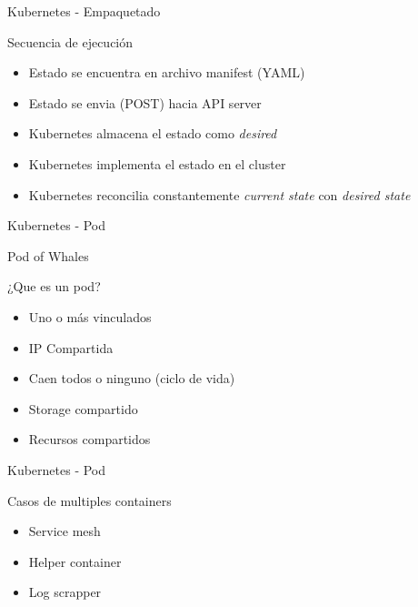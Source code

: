 \documentclass[aspectratio=169]{beamer}
\begin{document}
\begin{frame}{Kubernetes - Empaquetado}

    \begin{exampleblock}{Secuencia de ejecución}
        \begin{itemize}
            \item Estado se encuentra en archivo manifest (YAML)
            \item Estado se envia (POST) hacia API server
            \item Kubernetes almacena el estado como \textit{desired}
            \item Kubernetes implementa el estado en el cluster
            \item Kubernetes reconcilia constantemente \textit{current state} con \textit{desired state}
        \end{itemize}
    \end{exampleblock}

\end{frame}




\begin{frame}{Kubernetes - Pod}

Pod of Whales

            \begin{alertblock}{¿Que es un pod?}
                \begin{itemize}
                    \item Uno o más  vinculados
                    \item IP Compartida
                    \item Caen todos o ninguno (ciclo de vida)
                    \item Storage compartido
                    \item Recursos compartidos
                \end{itemize}
            \end{alertblock}

\end{frame}

\begin{frame}{Kubernetes - Pod}

Casos de multiples containers

                \begin{itemize}
                    \item Service mesh
                    \item Helper container
                    \item Log scrapper
                \end{itemize}

\end{frame}
\end{document}

